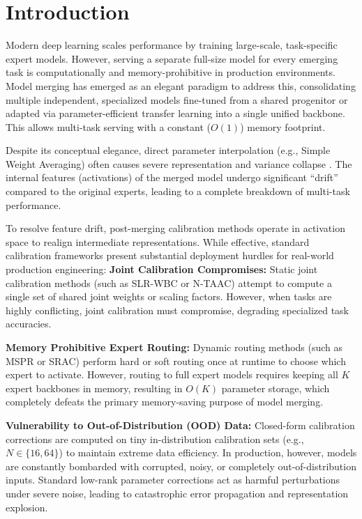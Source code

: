 \documentclass{article}
\theoremstyle{plain}
\theoremstyle{definition}
\theoremstyle{remark}
\begin{document}
\section{Introduction}
\label{sec:intro}
Modern deep learning scales performance by training large-scale, task-specific expert models. However, serving a separate full-size model for every emerging task is computationally and memory-prohibitive in production environments. Model merging \cite{wortsman2022model, ilharco2023editing, akiba2024evolutionary, wortsman2022robust} has emerged as an elegant paradigm to address this, consolidating multiple independent, specialized models fine-tuned from a shared progenitor or adapted via parameter-efficient transfer learning \cite{hu2021lora, houlsby2019parameter, pfeiffer2020adapterhub, he2021towards, sung2022vl, karimi2021compacter, lester2021power} into a single unified backbone. This allows multi-task serving with a constant ($O(1)$) memory footprint.

Despite its conceptual elegance, direct parameter interpolation (e.g., Simple Weight Averaging) often causes severe representation and variance collapse \cite{jordan2023repair, mu2024survey}. The internal features (activations) of the merged model undergo significant ``drift'' compared to the original experts, leading to a complete breakdown of multi-task performance. 

To resolve feature drift, post-merging calibration methods operate in activation space to realign intermediate representations. While effective, standard calibration frameworks present substantial deployment hurdles for real-world production engineering:
\textbf{Joint Calibration Compromises:} Static joint calibration methods (such as SLR-WBC \cite{pragmatist2026slrwbc} or N-TAAC) attempt to compute a single set of shared joint weights or scaling factors. However, when tasks are highly conflicting, joint calibration must compromise, degrading specialized task accuracies.

\textbf{Memory Prohibitive Expert Routing:} Dynamic routing methods (such as MSPR \cite{minimalist2026mspr} or SRAC) perform hard or soft routing once at runtime to choose which expert to activate. However, routing to full expert models requires keeping all $K$ expert backbones in memory, resulting in $O(K)$ parameter storage, which completely defeats the primary memory-saving purpose of model merging.

\textbf{Vulnerability to Out-of-Distribution (OOD) Data:} Closed-form calibration corrections are computed on tiny in-distribution calibration sets (e.g., $N \in \{16, 64\}$) to maintain extreme data efficiency. In production, however, models are constantly bombarded with corrupted, noisy, or completely out-of-distribution inputs. Standard low-rank parameter corrections act as harmful perturbations under severe noise, leading to catastrophic error propagation and representation explosion.
\end{document}
